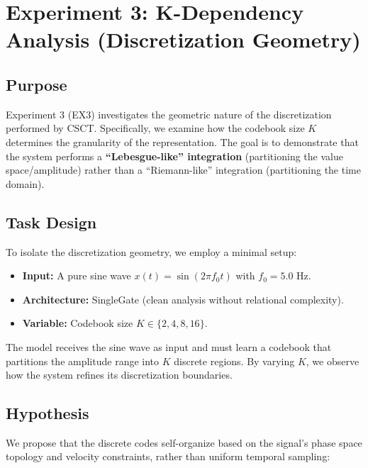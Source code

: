 \documentclass{article}
\begin{document}
\clearpage

\section{Experiment 3: K-Dependency Analysis (Discretization Geometry)}

\subsection{Purpose}
Experiment 3 (EX3) investigates the geometric nature of the discretization performed by CSCT. Specifically, we examine how the codebook size $K$ determines the granularity of the representation. The goal is to demonstrate that the system performs a \textbf{``Lebesgue-like'' integration} (partitioning the value space/amplitude) rather than a ``Riemann-like'' integration (partitioning the time domain).

\subsection{Task Design}
To isolate the discretization geometry, we employ a minimal setup:
\begin{itemize}
    \item \textbf{Input:} A pure sine wave $x(t) = \sin(2\pi f_0 t)$ with $f_0 = 5.0$ Hz.
    \item \textbf{Architecture:} SingleGate (clean analysis without relational complexity).
    \item \textbf{Variable:} Codebook size $K \in \{2, 4, 8, 16\}$.
\end{itemize}

The model receives the sine wave as input and must learn a codebook that partitions the amplitude range into $K$ discrete regions. By varying $K$, we observe how the system refines its discretization boundaries.

\subsection{Hypothesis}
We propose that the discrete codes self-organize based on the signal's phase space topology and velocity constraints, rather than uniform temporal sampling:
\end{document}
